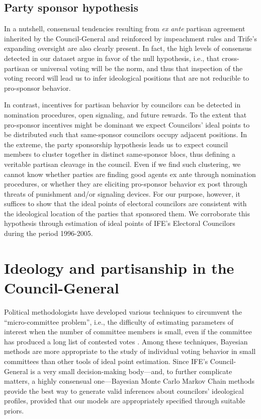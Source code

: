 \documentclass[12 pt, letter]{article}
\begin{document}
\subsection{Party sponsor hypothesis}
In a nutshell, consensual tendencies resulting from \emph{ex ante} partisan agreement inherited by the Council-General and reinforced by impeachment rules and {\sc Trife}'s expanding oversight are also clearly present.  In fact, the high levels of consensus detected in our dataset argue in favor of the null hypothesis, i.e., that cross-partisan or universal voting will be the norm, and thus that inspection of the voting record will lead us to infer ideological positions that are not reducible to pro-sponsor behavior.

In contrast, incentives for partisan behavior by councilors can be detected in nomination procedures, open signaling, and future rewards.  To the extent that pro-sponsor incentives might be dominant we expect Councilors' ideal points to be distributed such that same-sponsor councilors occupy adjacent positions.  In the extreme, the party sponsorship hypothesis leads us to expect council members to cluster together in distinct same-sponsor blocs, thus defining a veritable partisan cleavage in the council.  Even if we find such clustering, we cannot know whether parties are finding good agents ex ante through nomination procedures, or whether they are eliciting pro-sponsor behavior ex post through threats of punishment and/or signaling devices.  For our purpose, however, it suffices to show that the ideal points of electoral councilors are consistent with the ideological location of the parties that sponsored them.  We corroborate this hypothesis through estimation of ideal points of IFE's Electoral Councilors during the period 1996-2005.

\singlespacing
\section{Ideology and partisanship in the Council-General}\label{S:estimation}
\doublespacing Political methodologists have developed various techniques to circumvent the ``micro-committee problem'', i.e., the difficulty of estimating parameters of interest when the number of committee members is small, even if the committee has produced a long list of contested votes \citep{Londregan2000}.  Among these techniques, Bayesian methods \citep{Martin2002, Clinton2004, Jackman2001} are more appropriate to the study of individual voting behavior in small committees than other tools of ideal point estimation.  Since IFE's Council-General is a very small decision-making body---and, to further complicate matters, a highly consensual one---Bayesian Monte Carlo Markov Chain methods provide the best way to generate valid inferences about councilors' ideological profiles, provided that our models are appropriately specified through suitable priors.
\end{document}
